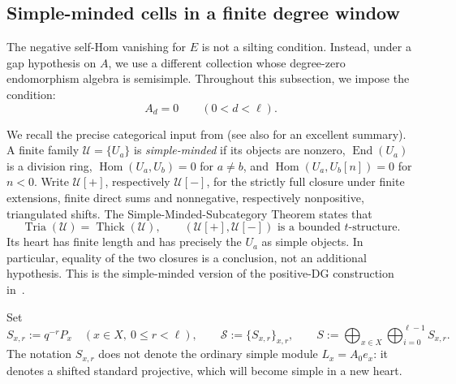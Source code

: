 \documentclass[11pt]{article}
\theoremstyle{definition}
\numberwithin{equation}{section}
\newcommand{\Hom}{\operatorname{Hom}}
\newcommand{\End}{\operatorname{End}}
\newcommand{\tria}{\operatorname{Tria}}
\newcommand{\thick}{\operatorname{Thick}}
\begin{document}
\subsection{Simple-minded cells in a finite degree window}
\label{sec:simple-minded-window}
The negative self-Hom vanishing for $E$ is not a silting condition.
Instead, under a gap hypothesis on $A$, we use a different collection whose degree-zero
endomorphism algebra is semisimple.  Throughout this subsection, we impose the condition:
\begin{equation}\label{eq:connected-open-gap}
 A_d=0\qquad(0<d<\ell).
\end{equation}

We recall the precise categorical input from \cite[Proposition 5.4]{KY14} (see also \cite{SchSimple} for an excellent summary).  A finite family
$\mathcal U=\{U_a\}$ is \emph{simple-minded} if its objects are nonzero,
$\End(U_a)$ is a division ring, $\Hom(U_a,U_b)=0$ for $a\ne b$, and
$\Hom(U_a,U_b[n])=0$ for $n<0$.
Write $\mathcal{U}[+]$, respectively
$\mathcal{U}[-]$, for the strictly full closure
under finite extensions, finite direct sums and nonnegative,
respectively nonpositive, triangulated shifts.
The Simple-Minded-Subcategory Theorem
\cite[Theorem~4.4]{SchSimple} states that
\begin{equation}\label{eq:simple-minded-criterion}
 \tria(\mathcal U)=\thick(\mathcal U),\qquad
 \left(\mathcal{U}[+],
       \mathcal{U}[-]\right)
 \text{ is a bounded }t\text{-structure}.
\end{equation}
Its heart has finite length and has precisely the $U_a$ as simple
objects.  In particular, equality of the two closures is a conclusion,
not an additional hypothesis.  This is the simple-minded version of the
positive-DG construction in~\cite[Theorem~8.1]{KeNi}.

Set
\begin{equation}\label{eq:window-cells}
 S_{x,r}:=q^{-r}P_x\quad(x\in X,\ 0\le r<\ell),\qquad
 \mathcal S:=\{S_{x,r}\}_{x,r},\qquad
 S:=\bigoplus_{x\in X}\bigoplus_{i=0}^{\ell-1} S_{x,r}.
\end{equation}
The notation $S_{x,r}$ does not denote the ordinary simple module
$L_x=A_0e_x$: it denotes a shifted standard projective, which will
become simple in a new heart.
\end{document}
